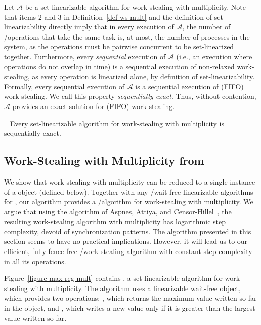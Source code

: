 Let \(\mathcal A\) be a set-linearizable algorithm for work-stealing with multiplicity. Note that items 2 and 3 in Definition~\ref{def-ws-mult} and the definition of set-linearizability directly imply that in every execution of \(\mathcal A\), the number of \Take/\Steal operations that take the same task is, at most, the number of processes in the system, as the operations must be pairwise concurrent to be set-linearized together. Furthermore, every \emph{sequential} execution of \(\mathcal A\) (i.e., an execution where operations do not overlap in time) is a sequential execution of non-relaxed work-stealing, as every operation is linearized alone, by definition of set-linearizability. Formally, every sequential execution of \(\mathcal A\) is a sequential execution of (FIFO) work-stealing. We call this property \emph{sequentially-exact}.  Thus, without contention, \(\mathcal A\) provides an exact solution for (FIFO) work-stealing.

\begin{remark}~\label{remark-seq-exact-set-lin}
Every set-linearizable algorithm for work-stealing with multiplicity is sequentially-exact.
\end{remark}

\subsection{\label{sec-ws-mult-max-reg}Work-Stealing with Multiplicity from \MaxReg}


We show that work-stealing with multiplicity can be reduced to a single instance of a \MaxReg object (defined below). Together with any \R/\W wait-free linearizable algorithms for \MaxReg, our algorithm provides a \R/\W algorithm for work-stealing with multiplicity. We argue that using the \MaxReg algorithm of Aspnes, Attiya, and Censor-Hillel~\cite{DBLP_journals_jacm_AspnesAC12}, the resulting work-stealing algorithm with multiplicity has logarithmic step complexity, devoid of \RAW synchronization patterns. The algorithm presented in this section seems to have no practical implications. However, it will lead us to our efficient, fully fence-free \R/\W work-stealing algorithm with constant step complexity in all its operations.

Figure~\ref{figure-max-reg-mult} contains \WFWSM, a set-linearizable algorithm for work-stealing with multiplicity. The algorithm uses a linearizable wait-free \MaxReg object, which provides two operations: \MaxR, which returns the maximum value written so far in the object, and \MaxW, which writes a new value only if it is greater than the largest value written so far.


